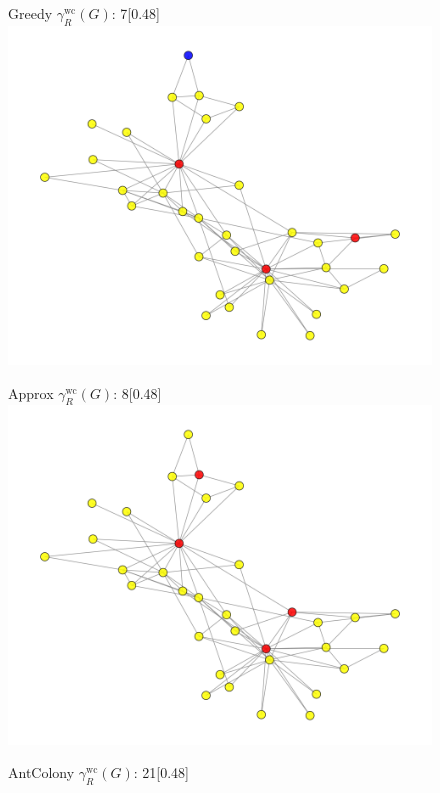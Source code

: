 \begin{figure}[H]
    \begin{subcaptionbox}{Greedy  $\gamma^{\text{wc}}_R(G)$: 7\label{fig:greedy}}[0.48\linewidth]
        {\includegraphics[width=\linewidth]{assets/Facebook/greedy.png}}
    \end{subcaptionbox}
    \hfill
    \begin{subcaptionbox}{Approx  $\gamma^{\text{wc}}_R(G)$: 8\label{fig:approx}}[0.48\linewidth]
        {\includegraphics[width=\linewidth]{assets/Facebook/approx.png}}
    \end{subcaptionbox}
    \hfill
    \begin{subcaptionbox}{AntColony  $\gamma^{\text{wc}}_R(G)$: 21\label{fig:ant}}[0.48\linewidth]

\end{subcaptionbox}
\end{figure}
